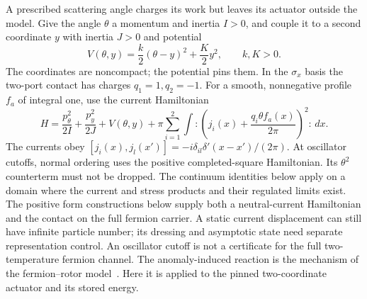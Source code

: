 A prescribed scattering angle charges its work but leaves its actuator
outside the model. Give the angle $\theta$ a momentum and inertia $I>0$,
and couple it to a second coordinate $y$ with inertia $J>0$ and potential
\begin{equation}\label{eq:inertial-potential}
 V(\theta,y)=\frac{k}{2}(\theta-y)^2+\frac{K}{2}y^2,
 \qquad k,K>0.
\end{equation}
The coordinates are noncompact; the potential pins them. In the
$\sigma_x$ basis the two-port contact has charges $q_1=1,q_2=-1$.
For a smooth, nonnegative profile $f_a$ of integral one, use the
current Hamiltonian
\begin{equation}\label{eq:inertial-H}
 H=\frac{p_\theta^2}{2I}+\frac{p_y^2}{2J}+V(\theta,y)
   +\pi\sum_{i=1}^2\int
       :\!\left(j_i(x)+\frac{q_i\theta f_a(x)}{2\pi}\right)^2\!:\,dx.
\end{equation}
The currents obey $[j_i(x),j_l(x')]=-i\delta_{il}\delta'(x-x')/(2\pi)$.
At oscillator cutoffs, normal ordering uses the positive completed-square
Hamiltonian. Its $\theta^2$ counterterm must not be dropped. The
continuum identities below apply on a domain where the current and
stress products and their regulated limits exist. The positive form
constructions below supply both a neutral-current Hamiltonian and
the contact on the full fermion carrier. A static
current displacement can still have infinite particle number; its
dressing and asymptotic state need separate representation control.
An oscillator cutoff is not a certificate
for the full two-temperature fermion channel.
The anomaly-induced reaction is the mechanism of the fermion--rotor
model~\cite[Sections~2.1--2.2]{LoladzeOkuiTong2026}. Here it is applied
to the pinned two-coordinate actuator and its stored energy.

